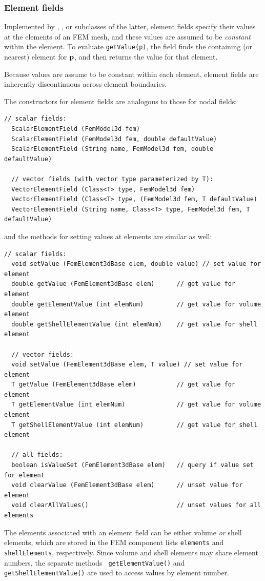 \subsubsection{Element fields}

Implemented by
,
, 
or subclasses of the latter, element fields specify their values at
the elements of an FEM mesh, and these values are assumed to be {\it
constant} within the element. To evaluate {\tt getValue(p)}, the field
finds the containing (or nearest) element for ${\bf p}$, and then returns
the value for that element.

\begin{sideblock}
Because values are assume to be constant within each element, element
fields are inherently discontinuous across element boundaries.
\end{sideblock}

The constructors for element fields are analogous to those
for nodal fields:
%
\begin{lstlisting}[]
  // scalar fields:
  ScalarElementField (FemModel3d fem)
  ScalarElementField (FemModel3d fem, double defaultValue)
  ScalarElementField (String name, FemModel3d fem, double defaultValue)

  // vector fields (with vector type parameterized by T):
  VectorElementField (Class<T> type, FemModel3d fem)
  VectorElementField (Class<T> type, (FemModel3d fem, T defaultValue)
  VectorElementField (String name, Class<T> type, FemModel3d fem, T defaultValue)
\end{lstlisting}
%
and the methods for setting values at elements are similar as
well:
%
\begin{lstlisting}[]
  // scalar fields:
  void setValue (FemElement3dBase elem, double value) // set value for element
  double getValue (FemElement3dBase elem)      // get value for element
  double getElementValue (int elemNum)         // get value for volume element
  double getShellElementValue (int elemNum)    // get value for shell element

  // vector fields:
  void setValue (FemElement3dBase elem, T value) // set value for element
  T getValue (FemElement3dBase elem)           // get value for element
  T getElementValue (int elemNum)              // get value for volume element
  T getShellElementValue (int elemNum)         // get value for shell element

  // all fields:
  boolean isValueSet (FemElement3dBase elem)   // query if value set for element
  void clearValue (FemElement3dBase elem)      // unset value for element
  void clearAllValues()                        // unset values for all elements
\end{lstlisting}
%
The elements associated with an element field can be either volume
{\it or} shell elements, which are stored in the FEM component lists
{\tt elements} and {\tt shellElements}, respectively. Since volume and
shell elements may share element numbers, the separate methods {\tt
getElementValue()} and {\tt getShellElementValue()} are used to access
values by element number.


